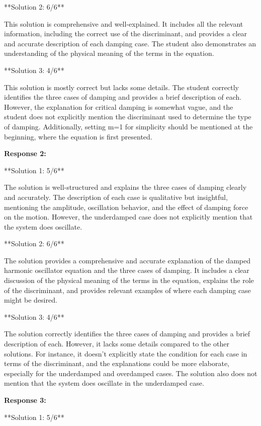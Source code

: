 \documentclass[a4paper,11pt]{article}
\begin{document}
**Solution 2: 6/6**

This solution is comprehensive and well-explained. It includes all the relevant information, including the correct use of the discriminant, and provides a clear and accurate description of each damping case. The student also demonstrates an understanding of the physical meaning of the terms in the equation.

**Solution 3: 4/6**

This solution is mostly correct but lacks some details. The student correctly identifies the three cases of damping and provides a brief description of each. However, the explanation for critical damping is somewhat vague, and the student does not explicitly mention the discriminant used to determine the type of damping. Additionally, setting m=1 for simplicity should be mentioned at the beginning, where the equation is first presented.

\bigskip    
\textbf{Response 2:}

**Solution 1: 5/6**

The solution is well-structured and explains the three cases of damping clearly and accurately. The description of each case is qualitative but insightful, mentioning the amplitude, oscillation behavior, and the effect of damping force on the motion. However, the underdamped case does not explicitly mention that the system does oscillate.

**Solution 2: 6/6**

The solution provides a comprehensive and accurate explanation of the damped harmonic oscillator equation and the three cases of damping. It includes a clear discussion of the physical meaning of the terms in the equation, explains the role of the discriminant, and provides relevant examples of where each damping case might be desired.

**Solution 3: 4/6**

The solution correctly identifies the three cases of damping and provides a brief description of each. However, it lacks some details compared to the other solutions. For instance, it doesn't explicitly state the condition for each case in terms of the discriminant, and the explanations could be more elaborate, especially for the underdamped and overdamped cases. The solution also does not mention that the system does oscillate in the underdamped case.

\bigskip    
\textbf{Response 3:}

**Solution 1: 5/6**
\end{document}
